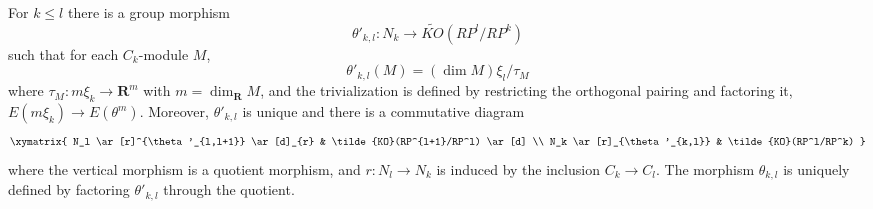 For $k \leq l$ there is a group morphism
$$\theta'_{k,l}: N_k \to \tilde{KO}(RP^l/RP^k)$$
such that for each $C_k$-module $M$,
$$\theta'_{k,l}(M) = (\dim M)\xi_l/\tau_M$$
where $\tau_M: m\xi_k \to \mathbf{R}^m$ with $m = \dim_{\mathbf{R}} M$, and the trivialization is defined by restricting the orthogonal pairing and factoring it, $E(m\xi_k) \to E(\theta^m)$. Moreover, $\theta'_{k,l}$ is unique and there is a commutative diagram
$$\xymatrix{
N_l \ar[r]^{\theta'_{l,l+1}} \ar[d]_{r} & \tilde{KO}(RP^{l+1}/RP^l) \ar[d] \\
N_k \ar[r]_{\theta'_{k,l}} & \tilde{KO}(RP^l/RP^k)
}$$
where the vertical morphism is a quotient morphism, and $r: N_l \to N_k$ is induced by the inclusion $C_k \to C_l$. The morphism $\theta_{k,l}$ is uniquely defined by factoring $\theta'_{k,l}$ through the quotient.
